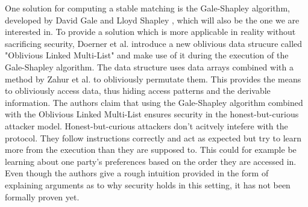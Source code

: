 One solution for computing a stable matching is the Gale-Shapley algorithm, developed by David Gale and Lloyd Shapley , which will also be the one we are interested in. To provide a solution which is more applicable in reality without sacrificing security, Doerner et al.  introduce a new oblivious data strucure called "Oblivious Linked Multi-List" and make use of it during the execution of the Gale-Shapley algorithm. The data structure uses data arrays combined with a method by Zahur et al.  to obliviously permutate them. This provides the means to obliviously access data, thus hiding access patterns and the derivable information. The authors claim that using the Gale-Shapley algorithm combined with the Oblivious Linked Multi-List ensures security in the honest-but-curious attacker model. Honest-but-curious attackers don't acitvely intefere with the protocol. They follow instructions correctly and act as expected but try to learn more from the execution than they are supposed to. This could for example be learning about one party's preferences based on the order they are accessed in. Even though the authors give a rough intuition provided in the form of explaining arguments as to why security holds in this setting, it has not been formally proven yet. \citeauthor{soktest}\\
\cite{sok}